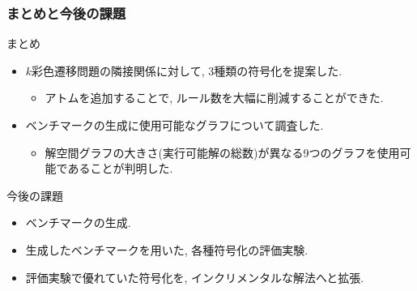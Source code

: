 \documentclass[dvipdfmx,11pt]{beamer}
\begin{document}
\begin{frame}\frametitle{まとめと今後の課題}

  \begin{block}{まとめ}
    \begin{itemize}
      \item $k$彩色遷移問題の隣接関係に対して, 3種類の符号化を提案した.
      \begin{itemize}
        \item アトムを追加することで, ルール数を大幅に削減することができた.
      \end{itemize}
      \item ベンチマークの生成に使用可能なグラフについて調査した.
      \begin{itemize}
        \item 解空間グラフの大きさ(実行可能解の総数)が異なる9つのグラフを使用可能であることが判明した.
      \end{itemize}
    \end{itemize}
  \end{block}
  
  \begin{alertblock}{今後の課題}
    \begin{itemize}
      \item ベンチマークの生成.
      \item 生成したベンチマークを用いた, 各種符号化の評価実験.
      \item 評価実験で優れていた符号化を, インクリメンタルな解法へと拡張.
    \end{itemize}
  \end{alertblock}

\end{frame}



\end{document}
